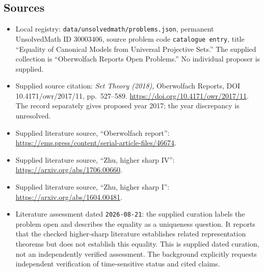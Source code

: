 \documentclass[11pt]{article}
\begin{document}
\subsection{Sources}
\begin{itemize}
\item Local registry: \texttt{data/unsolvedmath/problems.json}, permanent UnsolvedMath ID \(30003406\), source problem code \texttt{catalogue entry}, title ``Equality of Canonical Models from Universal Projective Sets.'' The supplied collection is ``Oberwolfach Reports Open Problems.'' No individual proposer is supplied.
\item Supplied source citation: \emph{Set Theory (2018)}, Oberwolfach Reports, DOI 10.4171/owr/2017/11, pp.~527--589. \url{https://doi.org/10.4171/owr/2017/11}. The record separately gives proposed year 2017; the year discrepancy is unresolved.
\item Supplied literature source, ``Oberwolfach report'': \url{https://ems.press/content/serial-article-files/46674}.
\item Supplied literature source, ``Zhu, higher sharp IV'': \url{https://arxiv.org/abs/1706.00660}.
\item Supplied literature source, ``Zhu, higher sharp I'': \url{https://arxiv.org/abs/1604.00481}.
\item Literature assessment dated \texttt{2026-08-21}: the supplied curation labels the problem open and describes the equality as a uniqueness question. It reports that the checked higher-sharp literature establishes related representation theorems but does not establish this equality. This is supplied dated curation, not an independently verified assessment. The background explicitly requests independent verification of time-sensitive status and cited claims.
\end{itemize}
\end{document}
